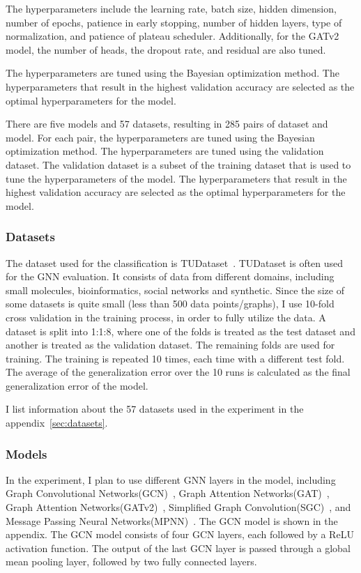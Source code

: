 \documentclass{article}
\begin{document}
The hyperparameters include the learning rate, batch size, hidden dimension, number of epochs, patience in early stopping, number of hidden layers, type of normalization, and patience of plateau scheduler. Additionally, for the GATv2 model, the number of heads, the dropout rate, and residual are also tuned.

The hyperparameters are tuned using the Bayesian optimization method\cite{frazier2018tutorial}. The hyperparameters that result in the highest validation accuracy are selected as the optimal hyperparameters for the model. 

There are five models and 57 datasets, resulting in 285 pairs of dataset and model. For each pair, the hyperparameters are tuned using the Bayesian optimization method. The hyperparameters are tuned using the validation dataset. The validation dataset is a subset of the training dataset that is used to tune the hyperparameters of the model. The hyperparameters that result in the highest validation accuracy are selected as the optimal hyperparameters for the model.

\subsubsection{Datasets}
The dataset used for the classification is TUDataset~\cite{morris2020tudataset}. TUDataset is often used for the GNN evaluation. It consists of data from different domains, including small molecules, bioinformatics, social networks and synthetic. Since the size of some datasets is quite small (less than 500 data points/graphs), I use 10-fold cross validation in the training process, in order to fully utilize the data. A dataset is split into 1:1:8, where one of the folds is treated as the test dataset and another is treated as the validation dataset. The remaining folds are used for training. The training is repeated 10 times, each time with a different test fold. The average of the generalization error over the 10 runs is calculated as the final generalization error of the model.

I list information about the 57 datasets used in the experiment in the appendix~\ref{sec:datasets}.

\subsubsection{Models}
In the experiment, I plan to use different GNN layers in the model, including Graph Convolutional Networks(GCN)~\cite{kipf2016semi}, Graph Attention Networks(GAT)~\cite{velickovic2020pointer}, Graph Attention Networks(GATv2)~\cite{brody2021attentive}, Simplified Graph Convolution(SGC)~\cite{wu2019simplifying}, and Message Passing Neural Networks(MPNN)~\cite{gilmer2017neural}. The GCN model is shown in the appendix. The GCN model consists of four GCN layers, each followed by a ReLU activation function. The output of the last GCN layer is passed through a global mean pooling layer, followed by two fully connected layers.
\end{document}
